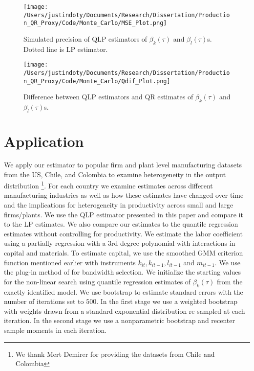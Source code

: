 \documentclass[11pt]{article}
\begin{document}


\begin{figure}[ht]
\centering
\caption{Simulated precision of  QLP estimators of $\beta_{k}(\tau)$ and $\beta_{l}(\tau)$s. Dotted line is LP estimator.}
\texttt{[image: /Users/justindoty/Documents/Research/Dissertation/Production\_QR\_Proxy/Code/Monte\_Carlo/MSE\_Plot.png]}
\label{fig:MSE}
\end{figure}

\begin{figure}[ht]
\centering
\caption{Difference between QLP estimators and QR estimates of $\beta_{k}(\tau)$ and $\beta_{l}(\tau)$s.}
\texttt{[image: /Users/justindoty/Documents/Research/Dissertation/Production\_QR\_Proxy/Code/Monte\_Carlo/Qdif\_Plot.png]}
\label{fig:QDIF}
\end{figure}

\newpage
\section{Application} \label{application}
We apply our estimator to popular firm and plant level manufacturing datasets from the US, Chile, and Colombia to examine heterogeneity in the output distribution \footnote{We thank Mert Demirer for providing the datasets from Chile and Colombia}. For each country we examine estimates across different manufacturing industries as well as how these estimates have changed over time and the implications for heterogeneity in productivity across small and large firms/plants. We use the QLP estimator presented in this paper and compare it to the LP estimates. We also compare our estimates to the quantile regression estimates without controlling for productivity. We estimate the labor coefficient using a partially regression with a 3rd degree polynomial with interactions in capital and materials. To estimate capital, we use the smoothed GMM criterion function mentioned earlier with instruments $k_{it}, k_{it-1}, l_{it-1}$ and $m_{it-1}$. We use the plug-in method of \cite{Kaplan2016} for bandwidth selection. We initialize the starting values for the non-linear search using quantile regression estimates of $\beta_{k}(\tau)$ from the exactly identified model. We use bootstrap to estimate standard errors with the number of iterations set to $500$. In the first stage we use a weighted bootstrap with weights drawn from a standard exponential distribution re-sampled at each iteration. In the second stage we use a nonparametric bootstrap and recenter sample moments in each iteration.
\end{document}
